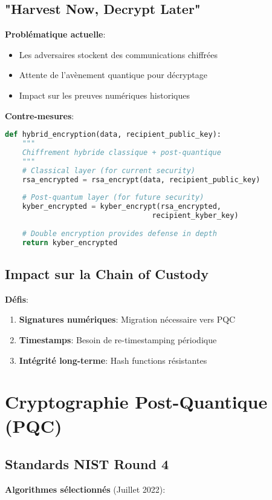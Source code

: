 \subsection{"Harvest Now, Decrypt Later"}
\textbf{Problématique actuelle}:

\begin{itemize}
\item Les adversaires stockent des communications chiffrées
\item Attente de l'avènement quantique pour décryptage
\item Impact sur les preuves numériques historiques
\end{itemize}

\textbf{Contre-mesures}:

\begin{lstlisting}[language=Python, caption=Migration vers la crypto hybride]
def hybrid_encryption(data, recipient_public_key):
    """
    Chiffrement hybride classique + post-quantique
    """
    # Classical layer (for current security)
    rsa_encrypted = rsa_encrypt(data, recipient_public_key)
    
    # Post-quantum layer (for future security)
    kyber_encrypted = kyber_encrypt(rsa_encrypted,
                                  recipient_kyber_key)
    
    # Double encryption provides defense in depth
    return kyber_encrypted
\end{lstlisting}

\subsection{Impact sur la Chain of Custody}
\textbf{Défis}:

\begin{enumerate}
\item \textbf{Signatures numériques}: Migration nécessaire vers PQC
\item \textbf{Timestamps}: Besoin de re-timestamping périodique
\item \textbf{Intégrité long-terme}: Hash functions résistantes
\end{enumerate}

\section{Cryptographie Post-Quantique (PQC)}
\subsection{Standards NIST Round 4}
\textbf{Algorithmes sélectionnés} (Juillet 2022):


